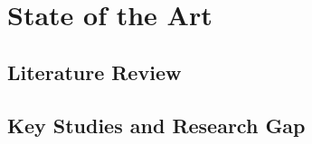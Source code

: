 \chapter{State of the Art}\label{sec:state-of-the-art}

\section{Literature Review}
\label{sec:state-of-the-art:literature-review}


\section{Key Studies and Research Gap}
\label{sec:state-of-the-art:key-studies}

